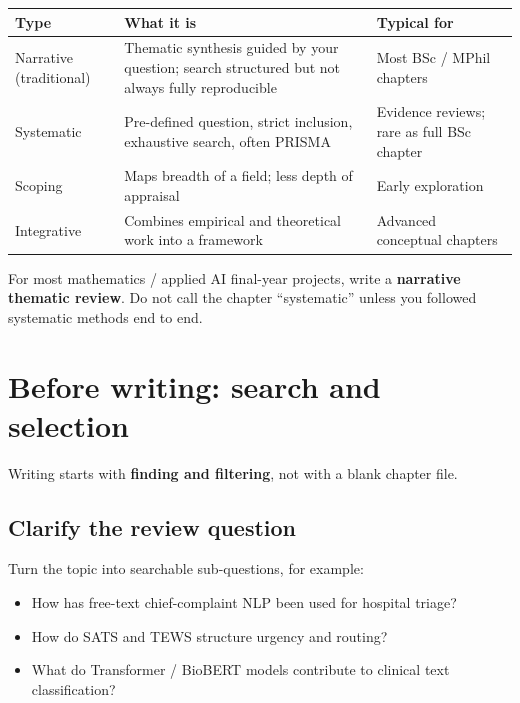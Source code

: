\documentclass[11pt,a4paper]{article}
\begin{document}
\begin{center}
\begin{tabular}{@{}p{}p{}p{}@{}}
\toprule
\textbf{Type} & \textbf{What it is} & \textbf{Typical for} \\
\midrule
Narrative (traditional) &
Thematic synthesis guided by your question; search structured but not always fully reproducible &
Most BSc / MPhil chapters \\
Systematic &
Pre-defined question, strict inclusion, exhaustive search, often PRISMA &
Evidence reviews; rare as full BSc chapter \\
Scoping &
Maps breadth of a field; less depth of appraisal &
Early exploration \\
Integrative &
Combines empirical and theoretical work into a framework &
Advanced conceptual chapters \\
\bottomrule
\end{tabular}
\end{center}

\begin{warnbox}
For most mathematics / applied AI final-year projects, write a \textbf{narrative thematic review}.
Do not call the chapter ``systematic'' unless you followed systematic methods end to end.
\end{warnbox}

\section{Before writing: search and selection}
\label{sec:search}

Writing starts with \textbf{finding and filtering}, not with a blank chapter file.

\subsection{Clarify the review question}
Turn the topic into searchable sub-questions, for example:
\begin{itemize}
  \item How has free-text chief-complaint NLP been used for hospital triage?
  \item How do SATS and TEWS structure urgency and routing?
  \item What do Transformer / BioBERT models contribute to clinical text classification?
\end{itemize}
\end{document}
